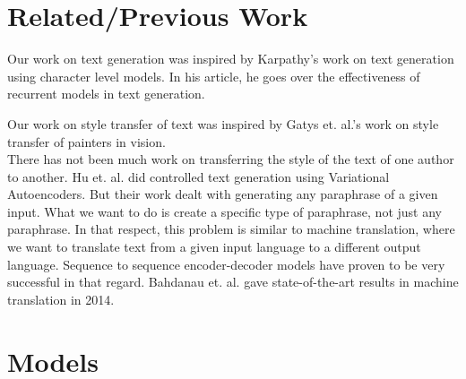 \documentclass{article} %
\begin{document}
\section{Related/Previous Work}
Our work on text generation was inspired by Karpathy's\cite{karpathy} work on text generation using character level models. In his article, he goes over the effectiveness of recurrent models in text generation.


Our work on style transfer of text was inspired by Gatys et. al.'s\cite{DBLP:journals/corr/GatysEB15a} work on style transfer of painters in vision.\\
There has not been much work on transferring the style of the text of one author to another. Hu et. al.\cite{DBLP:journals/corr/HuYLSX17} did controlled text generation using Variational Autoencoders\cite{2013arXiv1312.6114K}. But their work dealt with generating any paraphrase of a given input. What we want to do is create a specific type of paraphrase, not just any paraphrase. In that respect, this problem is similar to machine translation, where we want to translate text from a given input language to a different output language. Sequence to sequence encoder-decoder models have proven to be very successful in that regard. Bahdanau et. al. \cite{DBLP:journals/corr/BahdanauCB14} gave state-of-the-art results in machine translation in 2014. %
\newpage

\section{Models}
\end{document}

